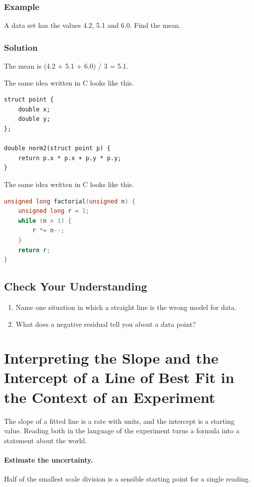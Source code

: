 \documentclass[11pt]{article}
\begin{document}
\subsubsection*{Example}

A data set has the values 4.2, 5.1 and 6.0. Find the mean.

\subsubsection*{Solution}

The mean is (4.2 + 5.1 + 6.0) / 3 = 5.1.

The same idea written in C looks like this.

{\small\begin{verbatim}
struct point {
    double x;
    double y;
};

double norm2(struct point p) {
    return p.x * p.x + p.y * p.y;
}
\end{verbatim}}

The same idea written in C looks like this.

\begin{lstlisting}[language=C]
unsigned long factorial(unsigned n) {
    unsigned long r = 1;
    while (n > 1) {
        r *= n--;
    }
    return r;
}
\end{lstlisting}

\subsection*{Check Your Understanding}
\begin{enumerate}
\item Name one situation in which a straight line is the wrong model for data.
\item What does a negative residual tell you about a data point?
\end{enumerate}

\section{Interpreting the Slope and the Intercept of a Line of Best Fit in the Context of an Experiment}

The slope of a fitted line is a rate with units, and the intercept is a starting value. Reading both in the language of the experiment turns a formula into a statement about the world.

\paragraph{Estimate the uncertainty.} Half of the smallest scale division is a sensible starting point for a single reading.
\end{document}

